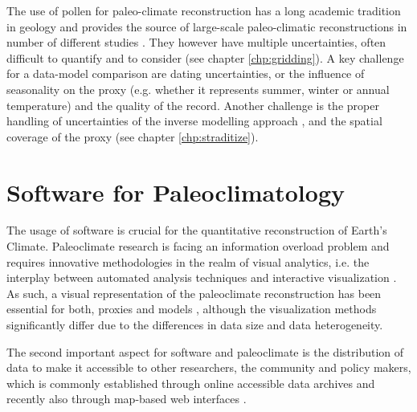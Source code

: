 \begin{refsection}
The use of pollen for paleo-climate reconstruction has a long academic tradition in geology \citep{Bradley1985} and provides the source of large-scale paleo-climatic reconstructions in number of different studies \citep[and more]{MauriDavisCollinsEtAl2015, DavisBrewerStevensonEtAl2003, MarsicekShumanBartleinEtAl2018, FischerJungclaus2011}. They however have multiple uncertainties, often difficult to quantify and to consider (see chapter \ref{chp:gridding}). A key challenge for a data-model comparison are dating uncertainties, or the influence of seasonality on the proxy (e.g. whether it represents summer, winter or annual temperature) and the quality of the record. Another challenge is the proper handling of uncertainties of the inverse modelling approach \citep[e.g.][]{GuiotVernal2011, TelfordBirks2009, TelfordBirks2005}, and the spatial coverage of the proxy (see chapter \ref{chp:straditize}).


\section{Software for Paleoclimatology} \label{sec:intro-software}

The usage of software is crucial for the quantitative reconstruction of Earth's Climate. Paleoclimate research is facing an information overload problem and requires innovative methodologies in the realm of visual analytics, i.e. the interplay between automated analysis techniques and interactive visualization \citep{KeimAndrienkoFeketeEtAl2008, Nocke2014}. As such, a visual representation of the paleoclimate reconstruction has been essential for both, proxies \citep{Nichols1967, Bradley1985, Grimm1988} and models \citep{Phillips1956, RautenhausBoettingerSiemenEtAl2018, NockeSterzelBoettingerEtAl2008, Nocke2014, BoettingerRoeber2019}, although the visualization methods significantly differ due to the differences in data size and data heterogeneity.

The second important aspect for software and paleoclimate is the distribution of data to make it accessible to other researchers, the community and policy makers, which is commonly established through online accessible data archives and recently also through map-based web interfaces \citep{WilliamsGrimmBloisEtAl2018, BollietBrockmannMassonDelmotteEtAl2016}.


\end{refsection}
